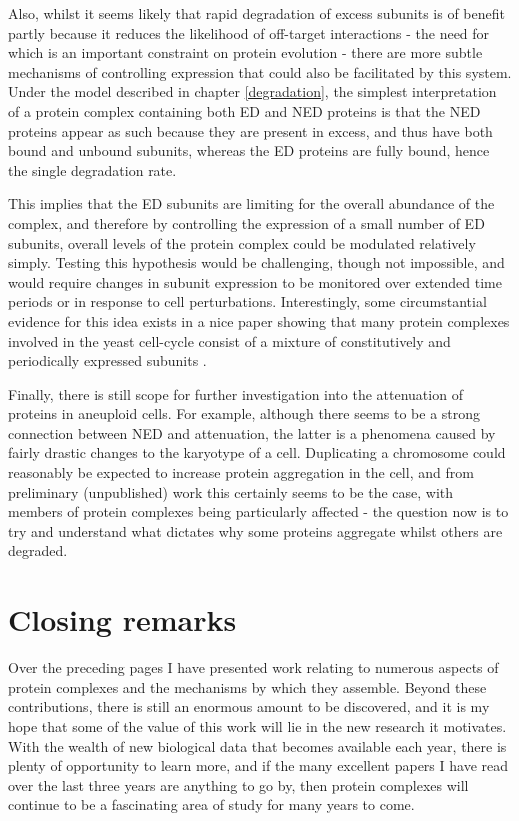 \documentclass[a4paper,11pt,twoside,openright]{scrbook}
\begin{document}
Also, whilst it seems likely that rapid degradation of excess subunits is of benefit partly because it reduces the likelihood of off-target interactions  - the need for which is an important constraint on protein evolution \cite{Yang2012} - there are more subtle mechanisms of controlling expression that could also be facilitated by this system. Under the model described in chapter \ref{degradation}, the simplest interpretation of a protein complex containing both ED and NED proteins is that the NED proteins appear as such because they are present in excess, and thus have both bound and unbound subunits, whereas the ED proteins are fully bound, hence the single degradation rate.

This implies that the ED subunits are limiting for the overall abundance of the complex, and therefore by controlling the expression of a small number of ED subunits, overall levels of the protein complex could be modulated relatively simply. Testing this hypothesis would be challenging, though not impossible, and would require changes in subunit expression to be monitored over extended time periods or in response to cell perturbations. Interestingly, some circumstantial evidence for this idea exists in a nice paper showing that many protein complexes involved in the yeast cell-cycle consist of a mixture of constitutively and periodically expressed subunits \cite{Lichtenberg2005}.

Finally, there is still scope for further investigation into the attenuation of proteins in aneuploid cells. For example, although there seems to be a strong connection between NED and attenuation, the latter is a phenomena caused by fairly drastic changes to the karyotype of a cell. Duplicating a chromosome could reasonably be expected to increase protein aggregation in the cell, and from preliminary (unpublished) work this certainly seems to be the case, with members of protein complexes being particularly affected - the question now is to try and understand what dictates why some proteins aggregate whilst others are degraded.

\section{Closing remarks}
Over the preceding pages I have presented work relating to numerous aspects of protein complexes and the mechanisms by which they assemble. Beyond these contributions, there is still an enormous amount to be discovered, and it is my hope that some of the value of this work will lie in the new research it motivates. With the wealth of new biological data that becomes available each year, there is plenty of opportunity to learn more, and if the many excellent papers I have read over the last three years are anything to go by, then protein complexes will continue to be a fascinating area of study for many years to come.
\end{document}
